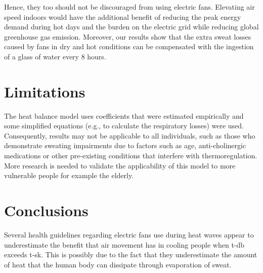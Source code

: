Hence, they too should not be discouraged from using electric fans.
Elevating air speed indoors would have the additional benefit of reducing the peak energy demand during hot days and the burden on the electric grid while reducing global greenhouse gas emission.
Moreover, our results show that the extra sweat losses caused by fans in dry and hot conditions can be compensated with the ingestion of a glass of water every 8 hours.


\section*{Limitations}
The  heat balance model uses coefficients that were estimated empirically and some simplified equations (e.g., to calculate the respiratory losses) were used.
Consequently, results may not be applicable to all individuals, such as those who demonstrate sweating impairments due to factors such as age, anti-cholinergic medications or other pre-existing conditions that interfere with thermoregulation.
More research is needed to validate the applicability of this model to more vulnerable people for example the elderly.

\section{Conclusions}\label{sec:conclusions}
Several health guidelines regarding electric fans use during heat waves appear to underestimate the benefit that air movement has in cooling people when \acf{t-db} exceeds \acf{t-sk}.
This is possibly due to the fact that they underestimate the amount of heat that the human body can dissipate through evaporation of sweat.

